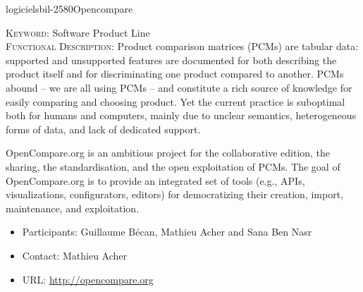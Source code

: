 \documentclass{ra2018}
\begin{document}
 \begin{module}{logiciels}{bil-2580}{Opencompare}

   \textsc{Keyword:} Software Product Line \\ 


   

 \textsc{Functional Description:}  Product comparison matrices (PCMs) are tabular data: supported and unsupported features are documented for both describing the product itself and for discriminating one product compared to another. PCMs abound – we are all using PCMs – and constitute a rich source of knowledge for easily comparing and choosing product. Yet the current practice is suboptimal both for humans and computers, mainly due to unclear semantics, heterogeneous forms of data, and lack of dedicated support. 

OpenCompare.org is an ambitious project for the collaborative edition, the sharing, the standardisation, and the open exploitation of PCMs. The goal of OpenCompare.org is to provide an integrated set of tools (e.g., APIs, visualizations, configurators, editors) for democratizing their creation, import, maintenance, and exploitation.\\

   \begin{itemize}
      \item Participants: Guillaume Bécan, Mathieu Acher and Sana Ben Nasr
      \item Contact: Mathieu Acher
      \item URL: \url{http://opencompare.org}
   \end{itemize}

 \end{module}
\end{document}
